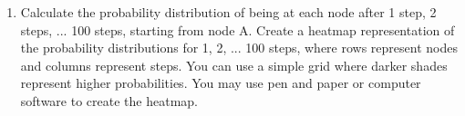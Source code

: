 \documentclass[a4paper, 14pt]{extarticle}
\begin{document}
\begin{enumerate}[resume]
\item Calculate the probability distribution of being at each node after 1 step, 2 steps, ... 100 steps, starting from node A. Create a heatmap representation of the probability distributions for 1, 2, ... 100 steps, where rows represent nodes and columns represent steps. You can use a simple grid where darker shades represent higher probabilities. You may use pen and paper or computer software to create the heatmap.

\begin{center}
\end{center}


\end{enumerate}
\end{document}
